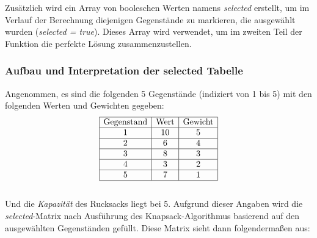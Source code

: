 Zusätzlich wird ein Array von booleschen Werten namens \textit{selected} erstellt, um im Verlauf der Berechnung diejenigen
Gegenstände zu markieren, die ausgewählt wurden (\textit{selected = true}). Dieses Array wird verwendet, um im zweiten
Teil der Funktion die perfekte Lösung zusammenzustellen.\\

\subsubsection*{Aufbau und Interpretation der selected Tabelle}
Angenommen, es sind die folgenden  5 Gegenstände (indiziert von 1 bis 5) mit den folgenden Werten und Gewichten gegeben:
\[
\begin{array}{|c|c|c|}
\hline
\text{Gegenstand} & \text{Wert} & \text{Gewicht} \\
\hline
1 & 10 & 5 \\
\hline
2 & 6 & 4 \\
\hline
3 & 8 & 3 \\
\hline
4 & 3 & 2 \\
\hline
5 & 7 & 1 \\
\hline
\end{array}
\]
\\
Und die \textit{Kapazität} des Rucksacks liegt bei 5. Aufgrund dieser Angaben wird die \textit{selected}-Matrix nach
Ausführung des Knapsack-Algorithmus basierend auf den ausgewählten Gegenständen gefüllt. Diese Matrix sieht dann folgendermaßen
aus:

